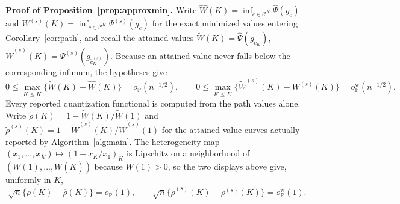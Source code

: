 \documentclass[11pt]{article}
\newcommand{\Pp}{\mathbb P}
\newcommand{\opro}{o_{\Pp}}
\newcommand{\calC}{\mathcal C}
\newcommand{\hPsi}{\widehat\Psi}
\begin{document}
\textbf{Proof of Proposition~\ref{prop:approxmin}.}
Write $\widehat W(K)=\inf_{c\in\calC^K}\hPsi(g_c)$ and $W^{(s)}(K)=\inf_{c\in\calC^K}\Psi^{(s)}(g_c)$ for the exact minimized values entering Corollary~\ref{cor:path}, and recall the attained values $\widetilde W(K)=\hPsi(g_{\tilde c_K})$, $\widetilde W^{(s)}(K)=\Psi^{(s)}(g_{\tilde c^{(s)}_K})$. Because an attained value never falls below the corresponding infimum, the hypotheses give
\begin{equation*}
0\le\max_{K\le\overline K}\{\widetilde W(K)-\widehat W(K)\}=\opro(n^{-1/2}),
\qquad
0\le\max_{K\le\overline K}\{\widetilde W^{(s)}(K)-W^{(s)}(K)\}=\opro^{\mathrm w}(n^{-1/2}).
\end{equation*}
Every reported quantization functional is computed from the path values alone. Write $\tilde\rho(K)=1-\widetilde W(K)/\widetilde W(1)$ and $\tilde\rho^{(s)}(K)=1-\widetilde W^{(s)}(K)/\widetilde W^{(s)}(1)$ for the attained-value curves actually reported by Algorithm~\ref{alg:main}. The heterogeneity map $(x_1,\dots,x_{\overline K})\mapsto(1-x_K/x_1)_K$ is Lipschitz on a neighborhood of $(W(1),\dots,W(\overline K))$ because $W(1)>0$, so the two displays above give, uniformly in $K$,
\begin{equation*}
\sqrt n\{\tilde\rho(K)-\hat\rho(K)\}=\opro(1),
\qquad
\sqrt n\{\tilde\rho^{(s)}(K)-\rho^{(s)}(K)\}=\opro^{\mathrm w}(1).
\end{equation*}
\end{document}
